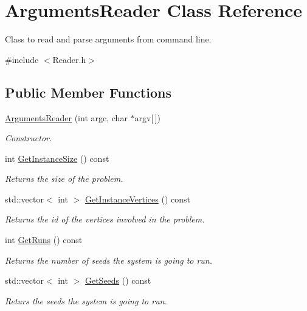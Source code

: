 \hypertarget{classArgumentsReader}{}\section{Arguments\+Reader Class Reference}
\label{classArgumentsReader}


Class to read and parse arguments from command line.  




{\ttfamily \#include $<$Reader.\+h$>$}

\subsection*{Public Member Functions}
\begin{DoxyCompactItemize}
\item 
\hyperlink{classArgumentsReader_adf40be74238d9297594ee6448c7d97f1}{Arguments\+Reader} (int argc, char $\ast$argv\mbox{[}$\,$\mbox{]})
\begin{DoxyCompactList}\small\item\em Constructor. \end{DoxyCompactList}\item 
\mbox{\label{classArgumentsReader_a7a66a3467dcfa89393615a82f9286fc6}} 
int \hyperlink{classArgumentsReader_a7a66a3467dcfa89393615a82f9286fc6}{Get\+Instance\+Size} () const
\begin{DoxyCompactList}\small\item\em Returns the size of the problem. \end{DoxyCompactList}\item 
\mbox{\label{classArgumentsReader_ac7caa0d26effd1fbf46b43199240916d}} 
std\+::vector$<$ int $>$ \hyperlink{classArgumentsReader_ac7caa0d26effd1fbf46b43199240916d}{Get\+Instance\+Vertices} () const
\begin{DoxyCompactList}\small\item\em Returns the id of the vertices involved in the problem. \end{DoxyCompactList}\item 
\mbox{\label{classArgumentsReader_a73c262c13fa33101de881c215bd5687c}} 
int \hyperlink{classArgumentsReader_a73c262c13fa33101de881c215bd5687c}{Get\+Runs} () const
\begin{DoxyCompactList}\small\item\em Returns the number of seeds the system is going to run. \end{DoxyCompactList}\item 
\mbox{\label{classArgumentsReader_afe0cdcb49e934f76d4151db7ce103846}} 
std\+::vector$<$ int $>$ \hyperlink{classArgumentsReader_afe0cdcb49e934f76d4151db7ce103846}{Get\+Seeds} () const
\begin{DoxyCompactList}\small\item\em Returs the seeds the system is going to run. \end{DoxyCompactList}\end{DoxyCompactItemize}
